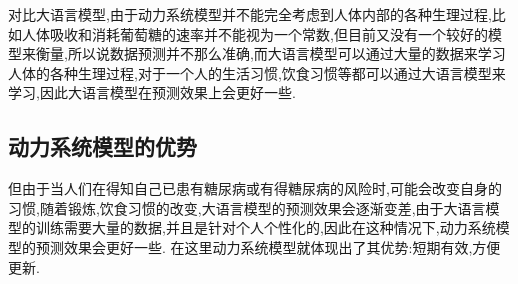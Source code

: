    对比大语言模型,由于动力系统模型并不能完全考虑到人体内部的各种生理过程,比如人体吸收和消耗葡萄糖的速率并不能视为一个常数,但目前又没有一个较好的模型来衡量,所以说数据预测并不那么准确,而大语言模型可以通过大量的数据来学习人体的各种生理过程,对于一个人的生活习惯,饮食习惯等都可以通过大语言模型来学习,因此大语言模型在预测效果上会更好一些. 

    \subsection*{动力系统模型的优势}

    但由于当人们在得知自己已患有糖尿病或有得糖尿病的风险时,可能会改变自身的习惯,随着锻炼,饮食习惯的改变,大语言模型的预测效果会逐渐变差,由于大语言模型的训练需要大量的数据,并且是针对个人个性化的,因此在这种情况下,动力系统模型的预测效果会更好一些. 在这里动力系统模型就体现出了其优势:短期有效,方便更新. 
